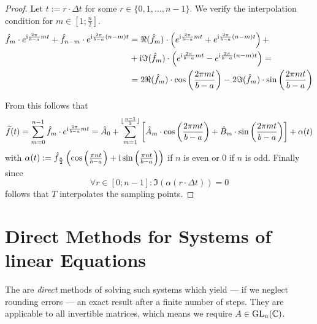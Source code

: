 \begin{proof}
   Let \(t := r \cdot \Delta t\) for some \(r \in \{0, 1, \ldots, n-1\}\).
   We verify the interpolation condition for \(m \in [1; \frac{n}{2}]\).
   \begin{equation*}
      \begin{split}
         \hat{f}_m \cdot e^{\mathrm{i} \frac{2\pi}{b-a} m t} + \hat{f}_{n-m} \cdot e^{\mathrm{i} \frac{2\pi}{b-a} (n-m) t} & = \Re(\hat{f}_m) \cdot \left(e^{\mathrm{i} \frac{2\pi}{b-a} m t} + e^{\mathrm{i} \frac{2\pi}{b-a} (n-m) t}\right) +\\
                                                                                                                 & + \mathrm{i} \Im(\hat{f}_m) \cdot \left(e^{\mathrm{i} \frac{2\pi}{b-a} m t} - e^{\mathrm{i} \frac{2\pi}{b-a} (n-m) t}\right) = \\
                                                                                                                 & = 2 \Re(\hat{f}_m) \cdot \cos\left(\frac{2\pi m t}{b-a}\right) - 2 \Im(\hat{f}_m) \cdot \sin\left(\frac{2\pi mt}{b-a}\right)
      \end{split}
   \end{equation*}

   From this follows that
   \[\widetilde{f}(t) = \sum_{m=0}^{n-1} \hat{f}_m \cdot e^{\mathrm{i} \frac{2\pi}{b-a} mt} = \hat{A}_0 + \sum_{m=1}^{\lfloor\frac{n-1}{2}\rfloor} \left[\hat{A}_m \cdot \cos\left(\frac{2\pi mt}{b-a}\right) + \hat{B}_m \cdot \sin\left(\frac{2\pi mt}{b-a}\right) \right] + \alpha(t)\]
   with \(\alpha(t) := \hat{f}_{\frac{n}{2}} \left(\cos\left(\frac{\pi nt}{b-a}\right) + \mathrm{i} \sin\left(\frac{\pi nt}{b-a}\right)\right)\) if \(n\) is even or 0 if \(n\) is odd.
   Finally since
   \[\forall r \in [0; n-1]: \Im(\alpha(r \cdot \Delta t)) = 0\]
   follows that \(T\) interpolates the sampling points.
\end{proof}




\section{Direct Methods for Systems of linear Equations}
The are \emph{direct} methods of solving such systems which yield --- if we neglect rounding errors --- an exact result after a finite number of steps.
They are applicable to all invertible matrices, which means we require \(A \in \operatorname{GL}_n(\mathbb{C})\).

